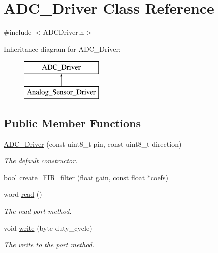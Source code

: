 \hypertarget{class_a_d_c___driver}{\section{\-A\-D\-C\-\_\-\-Driver \-Class \-Reference}
\label{class_a_d_c___driver}
}


{\ttfamily \#include $<$\-A\-D\-C\-Driver.\-h$>$}

\-Inheritance diagram for \-A\-D\-C\-\_\-\-Driver\-:\begin{figure}[H]
\begin{center}
\leavevmode
\includegraphics[height=2.000000cm]{class_a_d_c___driver}
\end{center}
\end{figure}
\subsection*{\-Public \-Member \-Functions}
\begin{DoxyCompactItemize}
\item 
\hyperlink{class_a_d_c___driver_a80f51622b357a63870fd2bdfabf62ba9}{\-A\-D\-C\-\_\-\-Driver} (const uint8\-\_\-t pin, const uint8\-\_\-t direction)
\begin{DoxyCompactList}\small\item\em \-The default constructor. \end{DoxyCompactList}\item 
bool \hyperlink{class_a_d_c___driver_aa1ccc2ac2edf43b3e6f8a1cee6a125fc}{create\-\_\-\-F\-I\-R\-\_\-filter} (float gain, const float $\ast$coefs)
\item 
word \hyperlink{class_a_d_c___driver_a02ba26c350ebff31c5ac7d2de861d321}{read} ()
\begin{DoxyCompactList}\small\item\em \-The read port method. \end{DoxyCompactList}\item 
void \hyperlink{class_a_d_c___driver_a7dd920205a602093ed1f176d0ade8751}{write} (byte duty\-\_\-cycle)
\begin{DoxyCompactList}\small\item\em \-The write to the port method. \end{DoxyCompactList}\end{DoxyCompactItemize}
